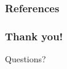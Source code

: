 \documentclass{beamer}
\begin{document}
\begin{frame}[allowframebreaks]
\frametitle{References}

\end{frame}

\begin{frame}
\frametitle{Thank you!}
\begin{center}
\Large Questions?
\end{center}
\vspace{2cm}
\InfContacts
\end{frame}
\end{document}
